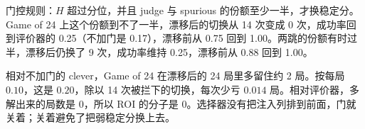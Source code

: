 \documentclass[UTF8,a4paper]{ctexart}
\begin{document}
门控规则：\(H\) 超过分位，并且 judge 与 spurious 的份额至少一半，才换稳定分。Game of 24 上这个份额到不了一半，漂移后的切换从 14 次变成 0 次，成功率回到评价器的 0.25（不加门是 0.17），漂移前从 0.75 回到 1.00。两跳的份额有时过半，漂移后仍换了 9 次，成功率维持 0.25，漂移前从 0.88 回到 1.00。

相对不加门的 clever，Game of 24 在漂移后的 24 局里多留住约 2 局。按每局 \(0.10\)，这是 \(0.20\)，除以 14 次被拦下的切换，每次少亏 \(0.014\) 局。相对评价器，多解出来的局数是 0，所以 ROI 的分子是 0。选择器没有把注入列排到前面，门就关着；关着避免了把弱稳定分换上去。
\end{document}
